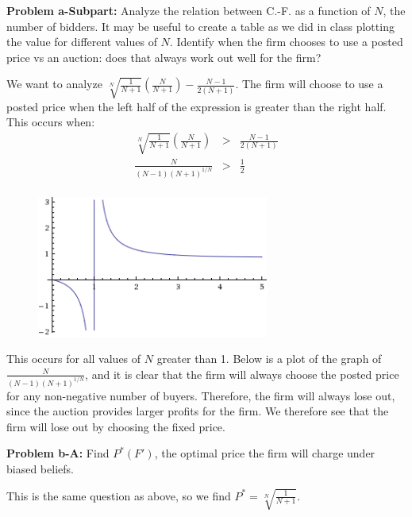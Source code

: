 \documentclass[psamsfonts]{amsart}
\newenvironment{sol}{\vspace{0.25cm}{\large \bfseries Solution:}}{\qedsymbol}
\newenvironment{prob}[1]{\begin{framed}{\large \bfseries Problem #1:}}{\end{framed}}
\begin{document}
\begin{prob}{a-Subpart}
Analyze the relation between C.-F. as a function of $N$, the number of bidders. It may be useful to create a table as we did in class plotting the value for different values of $N$. Identify when the firm chooses to use a posted price vs an auction: does that always work out well for the firm?
\end{prob}

\begin{sol}
We want to analyze $\sqrt[N]{\frac{1}{N+1}} \left(\frac{N}{N+1}\right) - \frac{N-1}{2(N+1)}$. The firm will choose to use a posted price when the left half of the expression is greater than the right half. This occurs when:
\begin{eqnarray}
\sqrt[N]{\frac{1}{N+1}} \left(\frac{N}{N+1}\right) &>& \frac{N-1}{2(N+1)} \\
\frac{N}{(N-1)(N+1)^{1/N}} &>& \frac{1}{2} \\
\end{eqnarray}

\begin{figure}[h!]
\includegraphics[width=3in]{ps2_analytical_graph.png}
\end{figure}

This occurs for all values of $N$ greater than 1. Below is a plot of the graph of $\frac{N}{(N-1)(N+1)^{1/N}}$, and it is clear that the firm will always choose the posted price for any non-negative number of buyers. Therefore, the firm will always lose out, since the auction provides larger profits for the firm. We therefore see that the firm will lose out by choosing the fixed price. 
\end{sol}

\begin{prob}{b-A}
Find $P^*(F')$, the optimal price the firm will charge under biased beliefs.
\end{prob}
\begin{sol}
This is the same question as above, so we find $P^* = \sqrt[N]{\frac{1}{N+1}}$. 
\end{sol}
\end{document}
